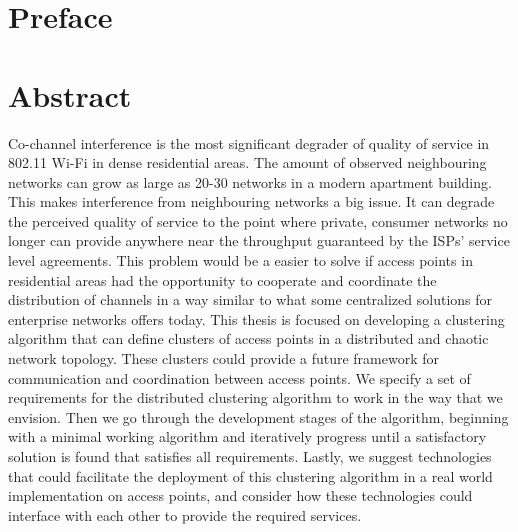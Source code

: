 \chapter*{Preface}

\chapter*{Abstract}
Co-channel interference is the most significant degrader of quality of service in 802.11 Wi-Fi in dense residential areas.
The amount of observed neighbouring networks can grow as large as 20-30 networks in a modern apartment building. This makes
interference from neighbouring networks a big issue. It can degrade the perceived quality of service to the point where private, consumer networks no longer can provide
anywhere near the throughput guaranteed by the ISPs' service level agreements. This problem would be a easier to solve if access points in residential areas had the
opportunity to cooperate and coordinate the distribution of channels in a way similar to what some centralized solutions for enterprise networks offers today.
This thesis is focused on developing a clustering algorithm that can define clusters of access points in a distributed and chaotic network topology. These clusters could 
provide a future framework for communication and coordination between access points.
We specify a set of requirements for the  distributed clustering algorithm to work in the way that we envision. Then we go through the development stages of the algorithm,
beginning with a minimal working algorithm and iteratively progress until a satisfactory solution is found that satisfies all requirements.
Lastly, we suggest technologies that could facilitate the deployment of this clustering algorithm in a real world implementation on access points, and consider
how these technologies could interface with each other to provide the required services.
